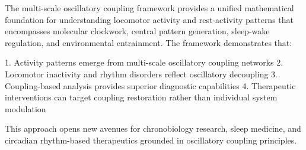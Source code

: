 \documentclass[twocolumn]{article}
\begin{document}
The multi-scale oscillatory coupling framework provides a unified mathematical foundation for understanding locomotor activity and rest-activity patterns that encompasses molecular clockwork, central pattern generation, sleep-wake regulation, and environmental entrainment. The framework demonstrates that:

1. Activity patterns emerge from multi-scale oscillatory coupling networks
2. Locomotor inactivity and rhythm disorders reflect oscillatory decoupling
3. Coupling-based analysis provides superior diagnostic capabilities
4. Therapeutic interventions can target coupling restoration rather than individual system modulation

This approach opens new avenues for chronobiology research, sleep medicine, and circadian rhythm-based therapeutics grounded in oscillatory coupling principles.



\end{document}
